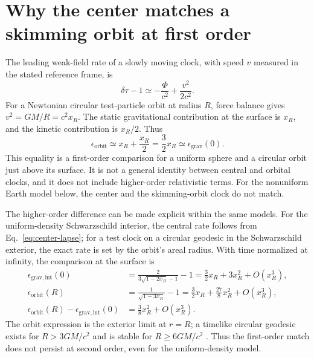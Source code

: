 \documentclass[12pt]{article}
\begin{document}
\section{Why the center matches a skimming orbit at first order}

The leading weak-field rate of a slowly moving clock, with speed $v$ measured in the stated reference frame, is
\begin{equation}
  \delta\tau-1
  \simeq-\frac{\Phi}{c^2}+\frac{v^2}{2c^2}.
  \label{eq:moving-rate}
\end{equation}
For a Newtonian circular test-particle orbit at radius $R$, force balance gives $v^2=GM/R=c^2x_R$. The static gravitational contribution at the surface is $x_R$, and the kinetic contribution is $x_R/2$. Thus
\begin{equation}
  \epsilon_{\mathrm{orbit}}\simeq x_R+\frac{x_R}{2}
  =\frac{3}{2}x_R
  \simeq\epsilon_{\mathrm{grav}}(0).
  \label{eq:center-orbit-match}
\end{equation}
This equality is a first-order comparison for a uniform sphere and a circular orbit just above its surface. It is not a general identity between central and orbital clocks, and it does not include higher-order relativistic terms. For the nonuniform Earth model below, the center and the skimming-orbit clock do not match.

\begin{samepage}
The higher-order difference can be made explicit within the same models. For the uniform-density Schwarzschild interior, the central rate follows from Eq.~\eqref{eq:center-lapse}; for a test clock on a circular geodesic in the Schwarzschild exterior, the exact rate is set by the orbit's areal radius. With time normalized at infinity, the comparison at the surface is
\begin{equation}
\begin{aligned}
  \epsilon_{\mathrm{grav,int}}(0)
  &=\frac{2}{3\sqrt{1-2x_R}-1}-1
   =\frac{3}{2}x_R+3x_R^2+O(x_R^3),\\
  \epsilon_{\mathrm{orbit}}(R)
  &=\frac{1}{\sqrt{1-3x_R}}-1
   =\frac{3}{2}x_R+\frac{27}{8}x_R^2+O(x_R^3),\\
  \epsilon_{\mathrm{orbit}}(R)-\epsilon_{\mathrm{grav,int}}(0)
  &=\frac{3}{8}x_R^2+O(x_R^3).
\end{aligned}
\label{eq:center-orbit-second-order}
\end{equation}
The orbit expression is the exterior limit at $r=R$; a timelike circular geodesic exists for $R>3GM/c^2$ and is stable for $R\geq6GM/c^2$ \cite{SchwarzschildExterior}. Thus the first-order match does not persist at second order, even for the uniform-density model.
\end{samepage}
\end{document}
